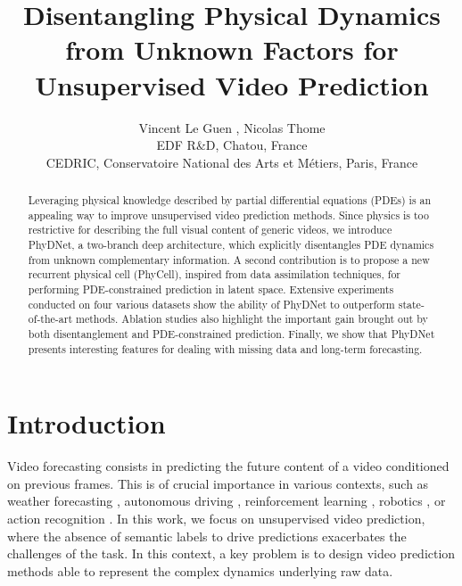 \documentclass[10pt,twocolumn,letterpaper]{article}
\begin{document}
\title{Disentangling Physical Dynamics from Unknown Factors for Unsupervised Video Prediction}


\author{
  Vincent Le Guen  ,  Nicolas Thome  \\
   EDF R\&D, Chatou, France \\
   CEDRIC, Conservatoire National des Arts et Métiers, Paris, France 
}



\maketitle


\begin{abstract}
Leveraging physical knowledge described by partial differential equations (PDEs) is an appealing way to improve unsupervised video prediction methods. Since physics is too restrictive for describing the full visual content of generic videos, we introduce PhyDNet, a two-branch deep architecture, which explicitly disentangles PDE dynamics from unknown complementary information. A second contribution is to propose a new  recurrent physical cell (PhyCell), inspired from data assimilation techniques, for performing PDE-constrained prediction in latent space. Extensive experiments conducted on four various datasets show the ability of PhyDNet to outperform state-of-the-art methods. Ablation studies also highlight the important gain brought out by both disentanglement and PDE-constrained prediction. Finally, we show that PhyDNet presents interesting features for dealing with  missing data and long-term forecasting.
\end{abstract}

\section{Introduction}
\label{sec:intro}
Video forecasting consists in predicting the future content of a video conditioned on previous frames. This is of crucial importance in various contexts, such as weather forecasting \cite{xingjian2015convolutional}, autonomous driving \cite{kwon2019predicting}, reinforcement learning \cite{oh2015action}, robotics \cite{finn2016unsupervised}, or action recognition \cite{liu2017video}. 
In this work, we focus on unsupervised video prediction, where the absence of semantic labels to drive predictions exacerbates the challenges of the task. 
In this context, a key problem is to design video prediction methods able to represent the complex dynamics underlying raw data.
\end{document}
